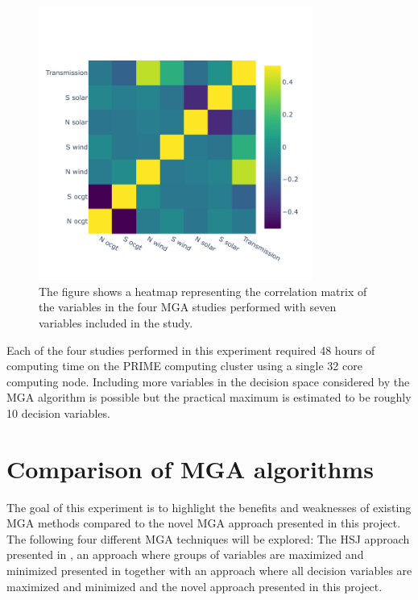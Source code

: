 \begin{figure}[h]\centerfloat
	\includegraphics[width=0.8\textwidth,trim={0 .5cm 0 2cm},clip]{./Images/7D_study_corr}
	\caption{The figure shows a heatmap representing the correlation matrix of the variables in the four MGA studies performed with seven variables included in the study.}
	\label{fig:7d_corr}
\end{figure}

Each of the four studies performed in this experiment required 48 hours of computing time on the PRIME computing cluster \cite{Prime} using a single 32 core computing node. Including more variables in the decision space considered by the MGA algorithm is possible but the practical maximum is estimated to be roughly 10 decision variables.  

\section{Comparison of MGA algorithms}\label{sec:MGA_comparisons}
The goal of this experiment is to highlight the benefits and weaknesses of existing MGA methods compared to the novel MGA approach presented in this project. The following four different MGA techniques will be explored: The HSJ approach presented in \cite{DeCarolis_MGA}, an approach where groups of variables are maximized and minimized presented in \cite{Fabian_MGA} together with an approach where all decision variables are maximized and minimized and the novel approach presented in this project. 

